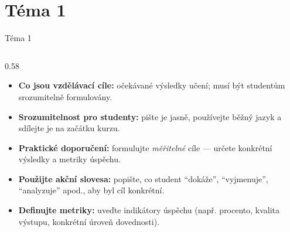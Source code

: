 \documentclass[aspectratio=169]{beamer}
\begin{document}
\section{Téma 1}
\begin{frame}{Téma 1}
\begin{columns}[T,onlytextwidth]
\begin{column}{0.58\textwidth}
\scriptsize
\begin{itemize}

\tightlist

\item

  \textbf{Co jsou vzdělávací cíle:} očekávané výsledky učení; musí být studentům srozumitelně formulovány.

\end{itemize}


\begin{itemize}

\tightlist

\item

  \textbf{Srozumitelnost pro studenty:} pište je jasně, používejte běžný jazyk a sdílejte je na začátku kurzu.

\end{itemize}


\begin{itemize}

\tightlist

\item

  \textbf{Praktické doporučení:} formulujte \emph{měřitelné} cíle --- určete konkrétní výsledky a metriky úspěchu.

\end{itemize}


\begin{itemize}

\tightlist

\item

  \textbf{Použijte akční slovesa:} popište, co student ``dokáže'', ``vyjmenuje'', ``analyzuje'' apod., aby byl cíl konkrétní.

\end{itemize}


\begin{itemize}

\tightlist

\item

  \textbf{Definujte metriky:} uveďte indikátory úspěchu (např. procento, kvalita výstupu, konkrétní úroveň dovednosti).


\end{itemize}
\end{column}
\end{columns}
\end{frame}
\end{document}
